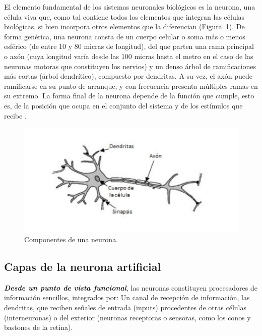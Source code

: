 \vspace{1\baselineskip}
El elemento fundamental de los sistemas neuronales biológicos es la neurona, una célula viva que, como tal contiene todos los elementos que integran las células biológicas, si bien incorpora otros elementos que la diferencian (Figura~\ref{fig:componentes}). De forma genérica, una neurona consta de un cuerpo celular o soma más o menos esférico (de entre 10 y 80 micras de longitud), del que parten una rama principal o axón (cuya longitud varía desde las 100 micras hasta el metro en el caso de las neuronas motoras que constituyen los nervios) y un denso árbol de ramificaciones más cortas (árbol dendrítico), compuesto por dendritas. A su vez, el axón puede ramificarse en su punto de arranque, y con frecuencia presenta múltiples ramas en su extremo. La forma final de la neurona depende de la función que cumple, esto es, de la posición que ocupa en el conjunto del sistema y de los estímulos que recibe \cite{lopez2008redes}.

\begin{figure}[H]
  \begin{center}
    \includegraphics[scale=0.70]{./neuroma_humana.png}
    \caption{Componentes de una neurona.}
    \label{fig:componentes}
  \end{center}
\end{figure}


\subsection{Capas de la neurona artificial}
\textbf{\textit{Desde un punto de vista funcional}}, las neuronas constituyen procesadores de información sencillos, integrados por:
Un canal de recepción de información, las dendritas, que reciben señales de entrada (inputs) procedentes de otras células (interneuronas) o del exterior (neuronas receptoras o sensoras, como los conos y bastones de la retina)\cite{sanchez2015maquinas}.

